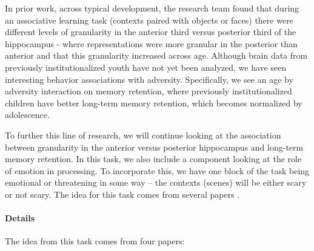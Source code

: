 \documentclass[]{book}
\let\oldparagraph\paragraph
\renewcommand{\paragraph}[1]{\oldparagraph{#1}\mbox{}}
\begin{document}
In prior work, across typical development, the research team found that during an associative learning task (contexts paired with objects or faces) there were different levels of granularity in the anterior third versus posterior third of the hippocampus - where representations were more granular in the posterior than anterior and that this granularity increased across age. Although brain data from previously institutionalized youth have not yet been analyzed, we have seen interesting behavior associations with adversity. Specifically, we see an age by adversity interaction on memory retention, where previously institutionalized children have better long-term memory retention, which becomes normalized by adolescence.

To further this line of research, we will continue looking at the association between granularity in the anterior versus posterior hippocampus and long-term memory retention. In this task, we also include a component looking at the role of emotion in processing. To incorporate this, we have one block of the task being emotional or threatening in some way -- the contexts (scenes) will be either scary or not scary. The idea for this task comes from several papers \citep{brunec_2018, lambert_2019, tambini_2010}.

\hypertarget{details-2}{%
\paragraph{Details}\label{details-2}}

The idea from this task comes from four papers:
\end{document}
